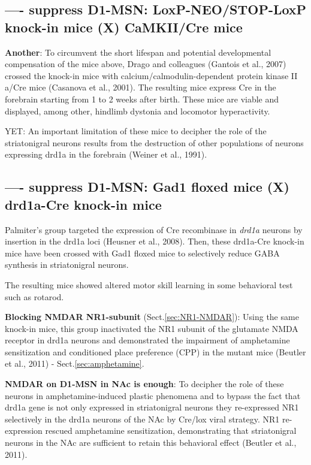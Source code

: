 \subsection{---- suppress D1-MSN: LoxP-NEO/STOP-LoxP knock-in mice (X)
CaMKII/Cre mice}

{\bf Another}: To circumvent the short lifespan and potential developmental
compensation of the mice above, Drago and colleagues (Gantois et al., 2007)
crossed the knock-in mice with calcium/calmodulin-dependent protein kinase II
a/Cre mice (Casanova et al., 2001). The resulting mice express Cre in the
forebrain starting from 1 to 2 weeks after birth. These mice are viable and
displayed, among other, hindlimb dystonia and locomotor hyperactivity.

YET: An important limitation of these mice to decipher the role of the
striatonigral neurons results from the destruction of other populations of
neurons expressing drd1a in the forebrain (Weiner et al., 1991).

\subsection{---- suppress D1-MSN: Gad1 floxed mice (X) drd1a-Cre knock-in mice}
\label{sec:amphetamine-D1-MSN}

Palmiter's group targeted the expression of Cre recombinase in {\it drd1a}
neurons by insertion in the drd1a loci (Heusner et al., 2008). Then, these
drd1a-Cre knock-in mice have been crossed with Gad1 floxed mice to selectively
reduce GABA synthesis in striatonigral neurons.

The resulting mice showed altered motor skill learning in some behavioral test
such as rotarod.

{\bf Blocking NMDAR NR1-subunit} (Sect.\ref{sec:NR1-NMDAR}): Using the same
knock-in mice, this group inactivated the NR1 subunit of the glutamate NMDA
receptor in drd1a neurons and demonstrated the impairment of amphetamine
sensitization and conditioned place preference (CPP) in the mutant mice (Beutler
et al., 2011) - Sect.\ref{sec:amphetamine}.

{\bf NMDAR on D1-MSN in NAc is enough}: To decipher the role of these neurons in
amphetamine-induced plastic phenomena and to bypass the fact that drd1a gene is
not only expressed in striatonigral neurons they re-expressed NR1 selectively in
the drd1a neurons of the NAc by Cre/lox viral strategy. NR1 re-expression
rescued amphetamine sensitization, demonstrating that striatonigral neurons in
the NAc are sufficient to retain this behavioral effect (Beutler et al., 2011).

